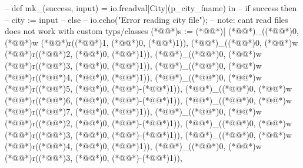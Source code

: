 \documentclass[a4paper]{article}
\begin{document}
\begin{vdm_al}
        -- def mk_(success, input) = io.freadval[City](p_city_fname) in
        --     if success then
        --         city := input
        --     else
        --         io.echo("Error reading city file\n");
        -- note: cant read files does not work with custom typs/classes
        (*@@*)s := (*@\vdmnotcovered{}@*)[
            (*@@*)_((*@@*)0, (*@@*)w (*@@*)r((*@\vdmnotcovered{}@*)1, (*@@*)0,  (*@\vdmnotcovered{}@*)1)),
            (*@@*)_((*@@*)0, (*@@*)w (*@@*)r((*@\vdmnotcovered{}@*)2, (*@@*)0,  (*@\vdmnotcovered{}@*)1)),
            (*@@*)_((*@@*)0, (*@@*)w (*@@*)r((*@\vdmnotcovered{}@*)3, (*@@*)0,  (*@\vdmnotcovered{}@*)1)),
            (*@@*)_((*@@*)0, (*@@*)w (*@@*)r((*@\vdmnotcovered{}@*)4, (*@@*)0,  (*@\vdmnotcovered{}@*)1)),
            (*@@*)_((*@@*)0, (*@@*)w (*@@*)r((*@\vdmnotcovered{}@*)5, (*@@*)0, (*@\vdmnotcovered{}@*)-(*@\vdmnotcovered{}@*)1)),
            (*@@*)_((*@@*)0, (*@@*)w (*@@*)r((*@\vdmnotcovered{}@*)6, (*@@*)0, (*@\vdmnotcovered{}@*)-(*@\vdmnotcovered{}@*)1)),
            (*@@*)_((*@@*)0, (*@@*)w (*@@*)r((*@\vdmnotcovered{}@*)7, (*@@*)0,  (*@\vdmnotcovered{}@*)1)),
            (*@@*)_((*@@*)0, (*@@*)w (*@@*)r((*@\vdmnotcovered{}@*)2, (*@@*)0, (*@\vdmnotcovered{}@*)-(*@\vdmnotcovered{}@*)1)),
            (*@@*)_((*@@*)0, (*@@*)w (*@@*)r((*@\vdmnotcovered{}@*)3, (*@@*)0, (*@\vdmnotcovered{}@*)-(*@\vdmnotcovered{}@*)1)),
            (*@@*)_((*@@*)0, (*@@*)w (*@@*)r((*@\vdmnotcovered{}@*)4, (*@@*)0,  (*@\vdmnotcovered{}@*)1)),
            (*@@*)_((*@@*)0, (*@@*)w (*@@*)r((*@\vdmnotcovered{}@*)3, (*@@*)0, (*@\vdmnotcovered{}@*)-(*@\vdmnotcovered{}@*)1)),

\end{vdm_al}
\end{document}
